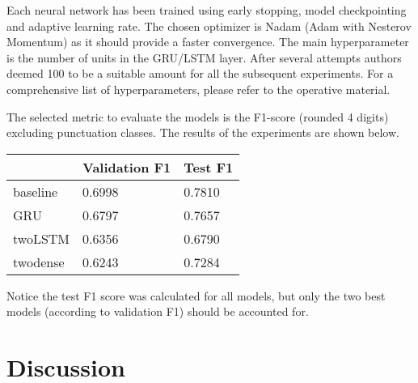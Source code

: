 \documentclass[11pt]{article}
\begin{document}
Each neural network has been trained using early stopping, model checkpointing and adaptive learning rate. The chosen optimizer is Nadam (Adam with Nesterov Momentum) as it should provide a faster convergence\cite{Dozat2016}. The main hyperparameter is the number of units in the GRU/LSTM layer. After several attempts authors deemed 100 to be a suitable amount for all the subsequent experiments. For a comprehensive list of hyperparameters, please refer to the operative material.

The selected metric to evaluate the models is the F1-score (rounded 4 digits) excluding punctuation classes. The results of the experiments are shown below.

\begin{table}[]
\centering
\begin{tabular}{@{}lll@{}}
\toprule
         & Validation F1 & Test F1 \\ \midrule
baseline & 0.6998        & 0.7810  \\ \midrule
GRU      & 0.6797        & 0.7657  \\ \midrule
twoLSTM  & 0.6356        & 0.6790  \\ \midrule
twodense & 0.6243        & 0.7284  \\ \bottomrule
\end{tabular}
\end{table}

Notice the test F1 score was calculated for all models, but only the two best models (according to validation F1) should be accounted for.

\section{Discussion}
\label{sec:discussion}


\end{document}
